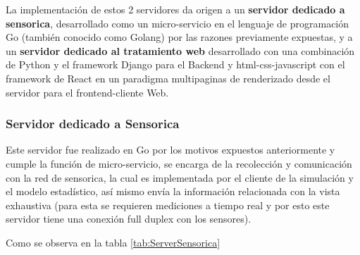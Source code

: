     La implementación de estos 2 servidores da origen a un \textbf{servidor dedicado
    a sensorica}, desarrollado como un micro-servicio en el lenguaje de programación
    Go (también conocido como Golang) por las razones previamente expuestas, y
    a un \textbf{servidor dedicado al tratamiento web} desarrollado con una
    combinación de Python y el framework Django para el Backend y html-css-javascript
    con el framework de React en un paradigma multipaginas de renderizado desde
    el servidor para el frontend-cliente Web.

    \subsubsection{Servidor dedicado a Sensorica}

    Este servidor fue realizado en Go por los motivos expuestos anteriormente y
    cumple la función de micro-servicio, se encarga de la recolección y comunicación
    con la red de sensorica, la cual es implementada por el cliente de la simulación
    y el modelo estadístico, así mismo envía la información relacionada con la
    vista exhaustiva (para esta se requieren mediciones a tiempo real y por esto
    este servidor tiene una conexión full duplex con los sensores).

    Como se observa en la tabla \ref{tab:ServerSensorica}

